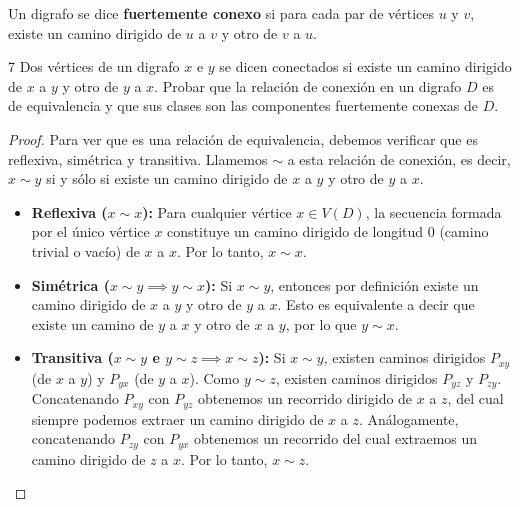 \begin{definition}
	Un digrafo se dice \textbf{fuertemente conexo} si para cada par de vértices \( u \) y \( v \), existe un camino dirigido de \( u \) a \( v \) y otro de \( v \) a \( u \).
\end{definition}

\begin{ejercicioEntregar}{7}
	Dos vértices de un digrafo \( x \) e \( y \) se dicen conectados si existe un camino dirigido de \( x \) a \( y \) y otro de \( y \) a \( x \). Probar que la relación de conexión en un digrafo \( D \) es de equivalencia y que sus clases son las componentes fuertemente conexas de \( D \).
\end{ejercicioEntregar}
\begin{proof}
	Para ver que es una relación de equivalencia, debemos verificar que es reflexiva, simétrica y transitiva. Llamemos \( \sim \) a esta relación de conexión, es decir, \( x \sim y \) si y sólo si existe un camino dirigido de \( x \) a \( y \) y otro de \( y \) a \( x \).

	\begin{itemize}
		\item \textbf{Reflexiva (\( x \sim x \)):} Para cualquier vértice \( x \in V(D) \), la secuencia formada por el único vértice \( x \) constituye un camino dirigido de longitud 0 (camino trivial o vacío) de \( x \) a \( x \). Por lo tanto, \( x \sim x \).

		\item \textbf{Simétrica (\( x \sim y \implies y \sim x \)):} Si \( x \sim y \), entonces por definición existe un camino dirigido de \( x \) a \( y \) y otro de \( y \) a \( x \). Esto es equivalente a decir que existe un camino de \( y \) a \( x \) y otro de \( x \) a \( y \), por lo que \( y \sim x \).

		\item \textbf{Transitiva (\( x \sim y \) e \( y \sim z \implies x \sim z \)):} Si \( x \sim y \), existen caminos dirigidos \( P_{xy} \) (de \( x \) a \( y \)) y \( P_{yx} \) (de \( y \) a \( x \)). Como \( y \sim z \), existen caminos dirigidos \( P_{yz} \) y \( P_{zy} \). Concatenando \( P_{xy} \) con \( P_{yz} \) obtenemos un recorrido dirigido de \( x \) a \( z \), del cual siempre podemos extraer un camino dirigido de \( x \) a \( z \). Análogamente, concatenando \( P_{zy} \) con \( P_{yx} \) obtenemos un recorrido del cual extraemos un camino dirigido de \( z \) a \( x \). Por lo tanto, \( x \sim z \).
	\end{itemize}


\end{proof}

